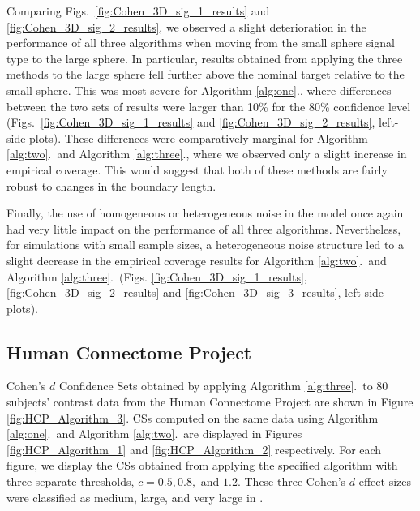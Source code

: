 Comparing Figs.\ \ref{fig:Cohen_3D_sig_1_results} and \ref{fig:Cohen_3D_sig_2_results}, we observed a slight deterioration in the performance of all three algorithms when moving from the small sphere signal type to the large sphere. In particular, results obtained from applying the three methods to the large sphere fell further above the nominal target relative to the small sphere. This was most severe for Algorithm \ref{alg:one}., where differences between the two sets of results were larger than 10\% for the 80\% confidence level (Figs.\ \ref{fig:Cohen_3D_sig_1_results} and \ref{fig:Cohen_3D_sig_2_results}, left-side plots). These differences were comparatively marginal for Algorithm \ref{alg:two}.\ and Algorithm \ref{alg:three}., where we observed only a slight increase in empirical coverage. This would suggest that both of these methods are fairly robust to changes in the boundary length.

Finally, the use of homogeneous or heterogeneous noise in the model once again had very little impact on the performance of all three algorithms. Nevertheless, for simulations with small sample sizes, a heterogeneous noise structure led to a slight decrease in the empirical coverage results for Algorithm \ref{alg:two}.\ and Algorithm \ref{alg:three}.\ (Figs. \ref{fig:Cohen_3D_sig_1_results}, \ref{fig:Cohen_3D_sig_2_results} and \ref{fig:Cohen_3D_sig_3_results}, left-side plots).

\subsection{Human Connectome Project} 
Cohen's $d$ Confidence Sets obtained by applying Algorithm \ref{alg:three}.\ to 80 subjects' contrast data from the Human Connectome Project are shown in Figure \ref{fig:HCP_Algorithm_3}. CSs computed on the same data using Algorithm \ref{alg:one}.\ and Algorithm \ref{alg:two}.\ are displayed in Figures \ref{fig:HCP_Algorithm_1} and \ref{fig:HCP_Algorithm_2} respectively. For each figure, we display the CSs obtained from applying the specified algorithm with three separate thresholds, $c= 0.5, 0.8,$ and $1.2$. These three Cohen's $d$ effect sizes were classified as medium, large, and very large in \citet*{Cohen2013-it}.

